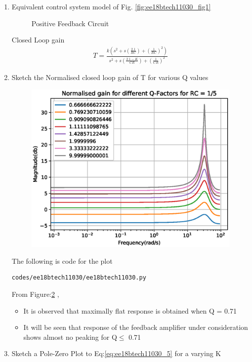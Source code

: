 \begin{enumerate}[label=\arabic*.,ref=\theenumi]
\item Equivalent control system model of Fig. \ref{fig:ee18btech11030_fig1}

\solution
\begin{figure}[!ht]
	\begin{center}
		\resizebox{\columnwidth/1}{!}{}
	\end{center}
	\caption{ Positive Feedback Circuit}
	\label{fig:ee18btech11030_fig2}
\end{figure}

Closed Loop gain 
\begin{align}
    T = \frac{k(s^2+s(\frac{2.1}{RC})+(\frac{1}{RC})^2)}{s^2 + s(\frac{2.1-K}{CR}) + (\frac{1}{CR})^2}
    \label{eq:ee18btech11030_5}
\end{align}

\item Sketch the Normalised closed loop gain of T for various Q values

\solution 
\begin{figure}[!h]
\centering
  \includegraphics[width=\columnwidth]{./figs/ee18btech11030/ee18btech11030_fc.eps}
\caption{}
\label{fig:ee18btech11030_fig3} 
\end{figure}

The following is code for the plot
\begin{lstlisting}
codes/ee18btech11030/ee18btech11030.py
\end{lstlisting}
From Figure:\ref{fig:ee18btech11030_fig3} ,
\begin{itemize}
\item It is observed that maximally flat response is obtained when Q = 0.71
\item It will be seen that response of the feedback amplifier under consideration shows almost no peaking for Q$\leq$ 0.71 
\end{itemize}
\item Sketch a Pole-Zero Plot to Eq:\ref{eq:ee18btech11030_5} for a varying K


\end{enumerate}
